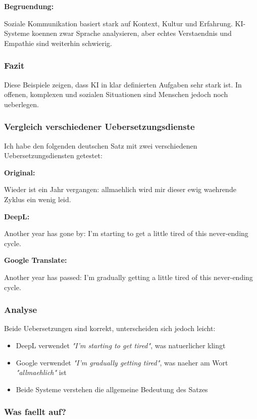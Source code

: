 \documentclass[12pt,a4paper]{article}
\begin{document}
\textbf{Begruendung:}

Soziale Kommunikation basiert stark auf Kontext, Kultur und Erfahrung.
KI-Systeme koennen zwar Sprache analysieren, aber echtes Verstaendnis und Empathie
sind weiterhin schwierig.

\subsubsection*{Fazit}

Diese Beispiele zeigen, dass KI in klar definierten Aufgaben sehr stark ist.
In offenen, komplexen und sozialen Situationen sind Menschen jedoch noch ueberlegen.

\subsubsection*{Vergleich verschiedener Uebersetzungsdienste}

Ich habe den folgenden deutschen Satz mit zwei verschiedenen
Uebersetzungsdiensten getestet:

\textbf{Original:}

Wieder ist ein Jahr vergangen: allmaehlich wird mir dieser ewig waehrende Zyklus ein wenig leid.

\textbf{DeepL:}

Another year has gone by: I'm starting to get a little tired of this never-ending cycle.

\textbf{Google Translate:}

Another year has passed: I'm gradually getting a little tired of this never-ending cycle.

\subsubsection*{Analyse}

Beide Uebersetzungen sind korrekt, unterscheiden sich jedoch leicht:

\begin{itemize}
    \item DeepL verwendet \textit{"I'm starting to get tired"}, was natuerlicher klingt
    \item Google verwendet \textit{"I'm gradually getting tired"}, was naeher am Wort \textit{"allmaehlich"} ist
    \item Beide Systeme verstehen die allgemeine Bedeutung des Satzes
\end{itemize}

\subsubsection*{Was faellt auf?}
\end{document}
